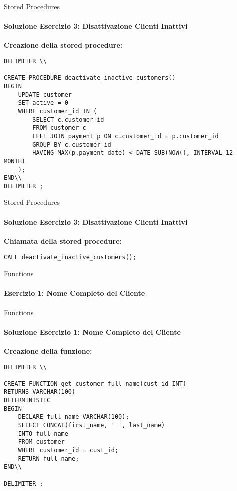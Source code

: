 \begin{frame}[fragile]{Stored Procedures}
\framesubtitle{Soluzione Esercizio 3: Disattivazione Clienti Inattivi}

\vspace{-.5cm}
\small
\textbf{Creazione della stored procedure:}
\begin{lstlisting}
DELIMITER \\

CREATE PROCEDURE deactivate_inactive_customers()
BEGIN
    UPDATE customer
    SET active = 0
    WHERE customer_id IN (
        SELECT c.customer_id
        FROM customer c
        LEFT JOIN payment p ON c.customer_id = p.customer_id
        GROUP BY c.customer_id
        HAVING MAX(p.payment_date) < DATE_SUB(NOW(), INTERVAL 12 MONTH)
    );
END\\
DELIMITER ;
\end{lstlisting}
\end{frame}
%
\begin{frame}[fragile]{Stored Procedures}
\framesubtitle{Soluzione Esercizio 3: Disattivazione Clienti Inattivi}
\consegnaSPsExOne

\vspace{.2cm}

\textbf{Chiamata della stored procedure:}
\begin{lstlisting}
CALL deactivate_inactive_customers();
\end{lstlisting}
\end{frame}
%
\begin{frame}[fragile]{Functions}
\framesubtitle{Esercizio 1: Nome Completo del Cliente}
\consegnaFunctionsExOne
\end{frame}
%
\begin{frame}[fragile]{Functions}
\framesubtitle{Soluzione Esercizio 1: Nome Completo del Cliente}

\vspace{-.5cm}
\small
\textbf{Creazione della funzione:}
\begin{lstlisting}
DELIMITER \\

CREATE FUNCTION get_customer_full_name(cust_id INT)
RETURNS VARCHAR(100)
DETERMINISTIC
BEGIN
    DECLARE full_name VARCHAR(100);
    SELECT CONCAT(first_name, ' ', last_name)
    INTO full_name
    FROM customer
    WHERE customer_id = cust_id;
    RETURN full_name;
END\\

DELIMITER ;
\end{lstlisting}
\end{frame}
